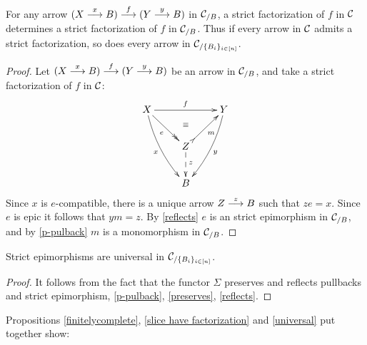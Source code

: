 \begin{proposition}\label{slice have factorization}
For any arrow  
\mbox{$(X \overset {x} {\longrightarrow} B) \overset {f} {\longrightarrow} (Y \overset {y} {\longrightarrow} B)$} in $\mathcal{C}_{/B}$, a strict factorization of $f$ in $\mathcal{C}$ determines a strict factorization of $f$ in 
$\mathcal{C}_{/B}$. Thus if every arrow in $\mathcal{C}$ admits a strict factorization, so does every arrow in $\mathcal{C}_{/\{B_i\}_{ i \in [n]}}$.
\end{proposition}
\begin{proof} 
Let $(X \overset {x} {\longrightarrow} B) \overset {f} {\longrightarrow} (Y \overset {y} {\longrightarrow} B)$ be an arrow in 
$\mathcal{C}_{/B}$, and 
take a strict factorization of $f$ in $\mathcal{C}$:
%
$$
\newdir{(>}{{}*!/-6pt/\dir{>}}
\xymatrix
    {
     X \ar[rr]^f \ar@{->>}[dr]_e 
       \ar@/_/[ddr]_{x} && Y \ar@/^/[ddl]^{y} 
   \\  
   & Z \ar@{(>->}[ur]_m 
       \ar@{}[u]|(.6){\equiv} 
       \ar@{-->}[d]^(.43){z} 
   &
    \\
   & B    
   &	          }
$$ 
% 
Since $x$ is $e$-compatible, there is a unique arrow 
$Z \overset {z} {\longrightarrow} B$ such that $ze = x$. Since $e$ is epic it follows that $ym = z$. By \ref{reflects} $e$ is an strict epimorphism in  $\mathcal{C}_{/B}$, and by \ref{p-pulback} $m$ is a monomorphism in  $\mathcal{C}_{/B}$. 
\end{proof}


\begin{proposition} \label{universal}
Strict epimorphisms are universal in $\mathcal{C}_{/\{B_i\}_{ i \in [n]}}$.
\end{proposition}
\begin{proof}
It follows from the fact that the functor $\Sigma$ preserves and reflects pullbacks and strict epimorphism, \ref{p-pulback},   
\ref{preserves}, \ref{reflects}.       
\end{proof}

\vspace{1ex}

Propositions \ref{finitelycomplete},  \ref{slice have factorization} and
 \ref{universal} put together show:

